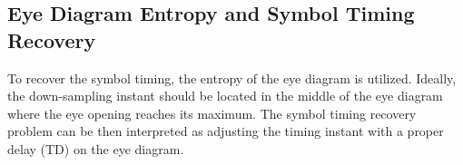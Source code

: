 \documentclass[journal,comsoc, onecolumn, 12pt,draftclsnofoot]{IEEEtran} %
\begin{document}
\subsection{Eye Diagram Entropy and Symbol Timing Recovery}
\label{sec:eye_entp}
To recover the symbol timing, the entropy of the eye diagram is utilized. 
Ideally, the down-sampling instant should be located in the middle of the eye diagram where the eye opening reaches its maximum.
The symbol timing recovery problem can be then interpreted as adjusting the timing instant with a proper delay (TD) on the eye diagram.
\end{document}
